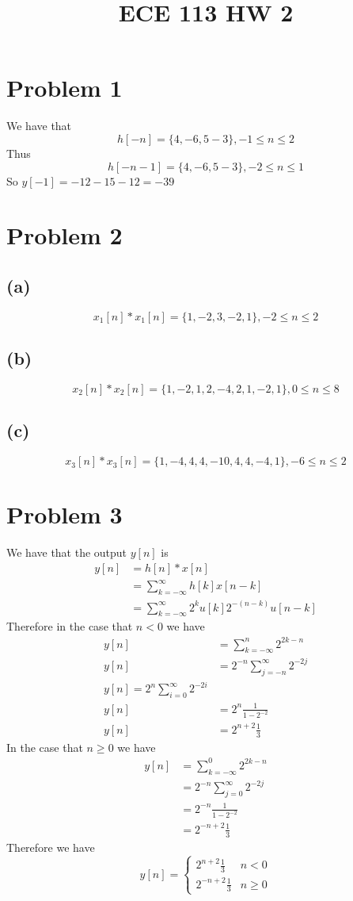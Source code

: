 
\title{ECE 113 HW 2}

\maketitle
\section*{Problem 1}
We have that 
$$h[-n]=\{4,-6,5-3\},-1\leq n \leq 2$$
Thus 
$$h[-n-1]=\{4,-6,5-3\},-2\leq n \leq 1$$
So $y[-1]=-12-15-12=\boxed{-39}$
\section*{Problem 2}
\subsection*{(a)}
$$x_1[n]*x_1[n]=\boxed{\{1,-2,3,-2,1\},-2\leq n \leq 2}$$
\subsection*{(b)}
$$x_2[n]*x_2[n]=\boxed{\{1,-2,1,2,-4,2,1,-2,1\},0\leq n \leq 8}$$
\subsection*{(c)}
$$x_3[n]*x_3[n]=\boxed{\{1, -4, 4, 4, -10, 4, 4, -4, 1\},-6\leq n \leq 2}$$
\section*{Problem 3}
We have that the output $y[n]$ is 
\begin{align*}
y[n]&=h[n]*x[n]\\
&=\sum_{k=-\infty}^{\infty}h[k]x[n-k]\\
&=\sum_{k=-\infty}^{\infty}2^{k}u[k]2^{-(n-k)}u[n-k]
\end{align*}
Therefore in the case that $n<0$ we have
\begin{align*}
y[n]&=\sum_{k=-\infty}^{n}2^{2k-n}\\
y[n]&=2^{-n}\sum_{j=-n}^{\infty}2^{-2j}\\
y[n]=2^{n}\sum_{i=0}^{\infty}2^{-2i}\\
y[n]&=2^{n}\frac{1}{1-2^{-2}}\\
y[n]&=2^{n+2}\frac{1}{3}
\end{align*}
In the case that $n\geq 0$ we have
\begin{align*}
y[n]&=\sum_{k=-\infty}^{0}2^{2k-n}\\
&=2^{-n}\sum_{j=0}^{\infty}2^{-2j}\\
&=2^{-n}\frac{1}{1-2^{-2}}\\
&=2^{-n+2}\frac{1}{3}
\end{align*}
Therefore we have
$$y[n]=\boxed{\begin{cases}
2^{n+2}\frac{1}{3} & n<0\\
2^{-n+2}\frac{1}{3} & n\geq 0
\end{cases}}$$

